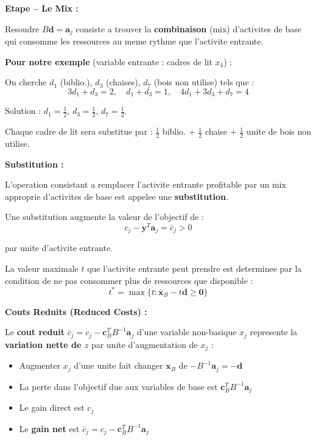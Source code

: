 \documentclass[12pt,a4paper]{article}
\newcommand*\circled[1]{\tikz[baseline=(char.base)]{\node[shape=circle,draw,inner sep=2pt] (char) {#1};}}
\begin{document}
\newpage
\begin{methode}
\textbf{Etape \circled{3} -- Le Mix :}

Resoudre $B\mathbf{d} = \mathbf{a}_j$ consiste a trouver la \textcolor{algoviolet}{\textbf{combinaison}} (mix) d'activites de base qui consomme les ressources au meme rythme que l'activite entrante.

\textbf{Pour notre exemple} (variable entrante : cadres de lit $x_4$) :

On cherche $d_1$ (biblio.), $d_3$ (chaises), $d_7$ (bois non utilise) tels que :
$$3d_1 + d_3 = 2, \quad d_1 + d_3 = 1, \quad 4d_1 + 3d_3 + d_7 = 4$$

Solution : $d_1 = \frac{1}{2}$, $d_3 = \frac{1}{2}$, $d_7 = \frac{1}{2}$.

Chaque cadre de lit sera substitue par : $\frac{1}{2}$ biblio. $+$ $\frac{1}{2}$ chaise $+$ $\frac{1}{2}$ unite de bois non utilise.
\end{methode}

\begin{definition}
\textbf{Substitution :}

L'operation consistant a remplacer l'activite entrante profitable par un mix approprie d'activites de base est appelee une \textcolor{defvert}{\textbf{substitution}}.

Une substitution augmente la valeur de l'objectif de :
$$c_j - \mathbf{y}^T \mathbf{a}_j = \bar{c}_j > 0$$

par unite d'activite entrante.

La valeur maximale $t$ que l'activite entrante peut prendre est determinee par la condition de ne pas consommer plus de ressources que disponible :
$$t^* = \max\{t : \bar{\mathbf{x}}_B - t\mathbf{d} \geq \mathbf{0}\}$$
\end{definition}

\begin{astuce}
\textbf{Couts Reduits (Reduced Costs) :}

Le \textcolor{algoviolet}{\textbf{cout reduit}} $\bar{c}_j = c_j - \mathbf{c}_B^T B^{-1} \mathbf{a}_j$ d'une variable non-basique $x_j$ represente la \textbf{variation nette de $z$} par unite d'augmentation de $x_j$ :

\begin{itemize}
    \item Augmenter $x_j$ d'une unite fait changer $\mathbf{x}_B$ de $-B^{-1}\mathbf{a}_j = -\mathbf{d}$
    \item La perte dans l'objectif due aux variables de base est $\mathbf{c}_B^T B^{-1}\mathbf{a}_j$
    \item Le gain direct est $c_j$
    \item Le \textbf{gain net} est $\bar{c}_j = c_j - \mathbf{c}_B^T B^{-1}\mathbf{a}_j$
\end{itemize}
\end{astuce}
\end{document}

